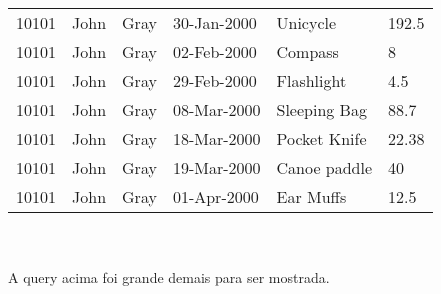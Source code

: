 \begin{tabular}{llllll}
    {10101}               & {John}               & {Gray}              & {30-Jan-2000}          & {Unicycle}            & {192.5}          \\
    {10101}               & {John}               & {Gray}              & {02-Feb-2000}          & {Compass}             & {8}              \\
    {10101}               & {John}               & {Gray}              & {29-Feb-2000}          & {Flashlight}          & {4.5}            \\
    {10101}               & {John}               & {Gray}              & {08-Mar-2000}          & {Sleeping Bag}        & {88.7}           \\
    {10101}               & {John}               & {Gray}              & {18-Mar-2000}          & {Pocket Knife}        & {22.38}          \\
    {10101}               & {John}               & {Gray}              & {19-Mar-2000}          & {Canoe paddle}        & {40}             \\
    {10101}               & {John}               & {Gray}              & {01-Apr-2000}          & {Ear Muffs}           & {12.5}
\end{tabular} \\ \\

A query acima foi grande demais para ser mostrada.
